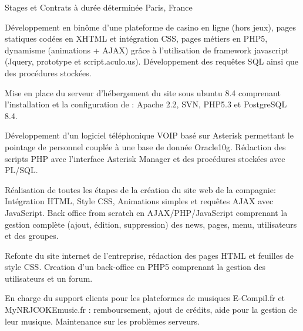 \cventry
{} %
{Stages et Contrats à durée déterminée} %
{Paris, France} %
{} %
{
\begin{cvsubentries}
    \begin{cvitems} %
        \item
        {
            Développement en binôme d’une plateforme de casino en ligne (hors jeux),
            pages statiques codées en XHTML et intégration CSS, pages métiers en PHP5, dynamisme
            (animations + AJAX) grâce à l’utilisation de framework javascript (Jquery, prototype et script.aculo.us).
            Développement des requêtes SQL ainsi que des procédures stockées.
        }
        \item
        {
            Mise en place du serveur d'hébergement du site sous ubuntu 8.4 comprenant l'installation et la
            configuration de : Apache 2.2, SVN, PHP5.3 et PostgreSQL 8.4.
        }
    \end{cvitems}
    \begin{cvitems} %
        \item
        {
            Développement d’un logiciel téléphonique VOIP basé sur Asterisk
            permettant le pointage de personnel couplée à une base de donnée Oracle10g.
            Rédaction des scripts PHP avec l'interface Asterisk Manager et des procédures stockées avec PL/SQL.
        }
        \item
        {
            Réalisation de toutes les étapes de la création du site web de la compagnie:
            Intégration HTML, Style CSS, Animations simples et requêtes AJAX avec JavaScript.
            Back office from scratch en AJAX/PHP/JavaScript comprenant la gestion complète (ajout,
            édition, suppression) des news, pages, menu, utilisateurs et des groupes.
        }
    \end{cvitems}
    \begin{cvitems} %
        \item
        {
            Refonte du site internet de l'entreprise, rédaction des pages HTML et feuilles de style CSS.
            Creation d'un back-office en PHP5 comprenant la gestion des utilisateurs et un forum.
        }
    \end{cvitems}
    \begin{cvitems} %
        \item
        {
            En charge du support clients pour les plateformes de musiques E-Compil.fr et 
            MyNRJCOKEmusic.fr : remboursement, ajout de crédits, aide pour la gestion de leur musique.
            Maintenance sur les problèmes serveurs.
        }
    \end{cvitems}
\end{cvsubentries}
}
